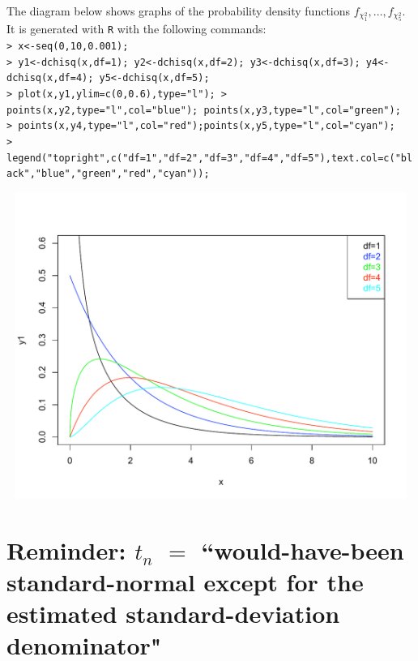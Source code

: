 \documentclass{article}
\begin{document}
The diagram below shows graphs of the probability density functions $f_{\chi^{2}_{1}}, \ldots, f_{\chi^{2}_{5}}$.
It is generated with \texttt{R} with the following commands:
\vskip 0.2cm
\texttt{
\small
\noindent\mbox{}\\
> x<-seq(0,10,0.001);  \\
> y1<-dchisq(x,df=1); y2<-dchisq(x,df=2); y3<-dchisq(x,df=3); y4<-dchisq(x,df=4); y5<-dchisq(x,df=5); \\
> plot(x,y1,ylim=c(0,0.6),type="l");
> points(x,y2,type="l",col="blue"); points(x,y3,type="l",col="green"); \\
> points(x,y4,type="l",col="red");points(x,y5,type="l",col="cyan"); \\
> legend("topright",c("df=1","df=2","df=3","df=4","df=5"),text.col=c("black","blue","green","red","cyan"));}
\mbox{}
\begin{center}
\vskip -1.0cm
\includegraphics[height=10cm,width=14cm]{ChiSquare-df1-thru-df5.pdf}
\end{center}


\section{Reminder: $t_{n}$ \;$=$\; ``would-have-been standard-normal except for the estimated standard-deviation denominator"}\label{tDistribution}
\setcounter{theorem}{0}
\end{document}
